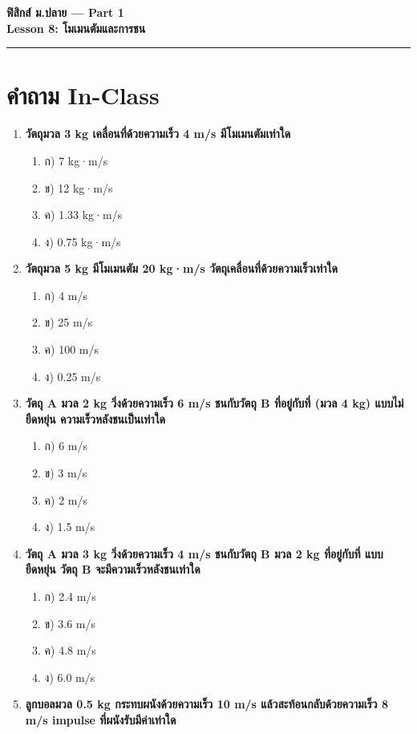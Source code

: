\documentclass[12pt]{article}
\begin{document}
\begin{center}
{\LARGE\textbf{ฟิสิกส์ ม.ปลาย — Part 1}}\\[0.3em]
{\Large\textbf{Lesson 8: โมเมนตัมและการชน}}\\[0.5em]
\rule{0.8\linewidth}{0.5pt}
\end{center}
\section*{คำถาม In-Class}
\begin{enumerate}
\item \textbf{วัตถุมวล 3 kg เคลื่อนที่ด้วยความเร็ว 4 m/s มีโมเมนตัมเท่าใด}
\begin{enumerate}
\item ก) 7 kg·m/s
\item ข) 12 kg·m/s
\item ค) 1.33 kg·m/s
\item ง) 0.75 kg·m/s
\end{enumerate}
\item \textbf{วัตถุมวล 5 kg มีโมเมนตัม 20 kg·m/s วัตถุเคลื่อนที่ด้วยความเร็วเท่าใด}
\begin{enumerate}
\item ก) 4 m/s
\item ข) 25 m/s
\item ค) 100 m/s
\item ง) 0.25 m/s
\end{enumerate}
\item \textbf{วัตถุ A มวล 2 kg วิ่งด้วยความเร็ว 6 m/s ชนกับวัตถุ B ที่อยู่กับที่ (มวล 4 kg) แบบไม่ยืดหยุ่น ความเร็วหลังชนเป็นเท่าใด}
\begin{enumerate}
\item ก) 6 m/s
\item ข) 3 m/s
\item ค) 2 m/s
\item ง) 1.5 m/s
\end{enumerate}
\item \textbf{วัตถุ A มวล 3 kg วิ่งด้วยความเร็ว 4 m/s ชนกับวัตถุ B มวล 2 kg ที่อยู่กับที่ แบบยืดหยุ่น วัตถุ B จะมีความเร็วหลังชนเท่าใด}
\begin{enumerate}
\item ก) 2.4 m/s
\item ข) 3.6 m/s
\item ค) 4.8 m/s
\item ง) 6.0 m/s
\end{enumerate}
\item \textbf{ลูกบอลมวล 0.5 kg กระทบผนังด้วยความเร็ว 10 m/s แล้วสะท้อนกลับด้วยความเร็ว 8 m/s impulse ที่ผนังรับมีค่าเท่าใด}

\end{enumerate}
\end{document}
